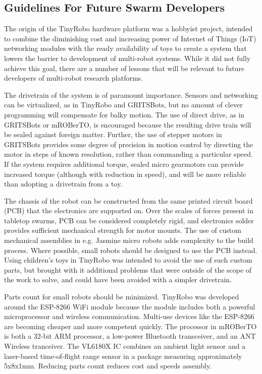 \subsection{Guidelines For Future Swarm Developers}
The origin of the TinyRobo hardware platform was a hobbyist project, intended to combine the diminishing cost and increasing power of Internet of Things (IoT) networking modules with the ready availability of toys to create a system that lowers the barrier to development of multi-robot systems.
While it did not fully achieve this goal, there are a number of lessons that will be relevant to future developers of multi-robot research platforms. 

The drivetrain of the system is of paramount importance. 
Sensors and networking can be virtualized, as in TinyRobo and GRITSBots, but no amount of clever programming will compensate for balky motion. 
The use of direct drive, as in GRITSBots or mROBerTO, is encouraged because the resulting drive train will be sealed against foreign matter. 
Further, the use of stepper motors in GRITSBots provides some degree of precision in motion control by directing the motor in steps of known resolution, rather than commanding a particular speed. 
If the system requires additional torque, sealed micro gearmotors can provide increased torque (although with reduction in speed), and will be more reliable than adopting a drivetrain from a toy. 

The chassis of the robot can be constructed from the same printed circuit board (PCB) that the electronics are supported on. 
Over the scales of forces present in tabletop swarms, PCB can be considered completely rigid, and electronics solder provides sufficient mechanical strength for motor mounts. 
The use of custom mechanical assemblies in e.g. Jasmine micro robots adds complexity to the build process. 
Where possible, small robots should be designed to use the PCB instead. 
Using children's toys in TinyRobo was intended to avoid the use of such custom parts, but brought with it additional problems that were outside of the scope of the work to solve, and could have been avoided with a simpler drivetrain. 

Parts count for small robots should be minimized.
TinyRobo was developed around the ESP-8266 WiFi module because the module includes both a powerful microprocessor and wireless communication. 
Multi-use devices like the ESP-8266 are becoming cheaper and more competent quickly.
The processor in mROBerTO is both a 32-bit ARM processor, a low-power Bluetooth transceiver, and an ANT Wireless tranceiver. 
The VL6180X IC combines an ambient light sensor and a laser-based time-of-flight range sensor in a package measuring approximately 5x8x1mm. 
Reducing parts count reduces cost and speeds assembly. 

